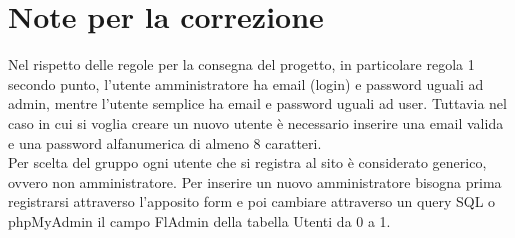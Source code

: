 
\section*{Note per la correzione}
Nel rispetto delle regole per la consegna del progetto, in particolare regola 1 secondo punto, l'utente amministratore ha email (login) e password uguali ad admin, mentre l’utente semplice ha email e password uguali ad user. Tuttavia nel caso in cui si voglia creare un nuovo utente è necessario inserire una email valida e una password alfanumerica di almeno 8 caratteri. \\
Per scelta del gruppo ogni utente che si registra al sito è considerato generico, ovvero non amministratore. Per inserire un nuovo amministratore bisogna prima registrarsi attraverso l'apposito form e poi cambiare attraverso un query SQL o phpMyAdmin il campo FlAdmin della tabella Utenti da 0 a 1.
